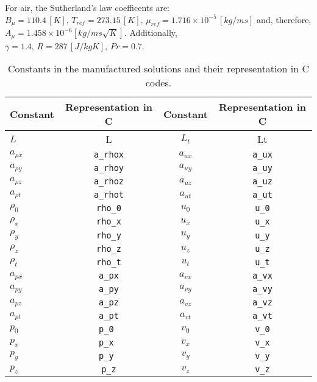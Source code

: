 For air, the Sutherland's law coefficents are: $B_\mu   = 110.4 \, [K], \, T_{ref} = 273.15 \, [K],  \, \mu_{ref} = 1.716\times 10^{-5}\, [kg/ms]$ and, therefore, $A_\mu=1.458\times 10^{-6} [kg /ms\sqrt{K}]$. Additionally, $\gamma  = 1.4 ,\, R = 287 \, [J/kg K],\, Pr  = 0.7$. 

\begin{table}[htb]
\caption{Constants in the manufactured solutions and their representation in C codes.}
\centering
\begin{tabular}{l c | c c}
\hline\hline
     Constant     &Representation in C  & Constant     & Representation in C \\ [0.25ex]
\hline 
$L$			  & L	   				&  $ L_{t}$ 	& Lt	   \\
$ a_{\rho x}$ & \texttt{a\_rhox}	&  $a_{ux}$ 	&\texttt{a\_ux}    \\ 
$ a_{\rho y}$ & \texttt{a\_rhoy}	&  $ a_{uy}$ 	& \texttt{a\_uy}   \\ 
$ a_{\rho z}$ & \texttt{a\_rhoz}	&  $ a_{uz}$ 	& \texttt{a\_uz}   \\ 
$ a_{\rho t}$ & \texttt{a\_rhot}	&  $ a_{ut}$ 	& \texttt{a\_ut}   \\ 
$ \rho_{0}$  & 	\texttt{rho\_0}   	&  $ u_{0}$ 		& \texttt{u\_0}   \\ 
$ \rho_{x}$ & 	\texttt{rho\_x}   	&  $ u_{x}$ 	& \texttt{u\_x}   \\
$ \rho_{y}$ & 	\texttt{rho\_y}   	&  $ u_{y}$ 	& \texttt{u\_y}   \\ 
$ \rho_{z}$ & 	\texttt{rho\_z}   	&  $ u_{z}$ 	& \texttt{u\_z}   \\ 
$ \rho_{t}$ & 	\texttt{rho\_t}   	&  $ u_{t}$ 	& \texttt{u\_t}   \\ 
$ a_{px}$ & 	\texttt{a\_px}   	&  $ a_{vx}$ 	& \texttt{a\_vx}   \\ 
$ a_{py}$ & 	\texttt{a\_py}   	&  $ a_{vy}$ 	& \texttt{a\_vy}   \\ 
$ a_{pz}$ & 	\texttt{a\_pz}   	&  $ a_{vz}$ 	& \texttt{a\_vz}   \\ 
$ a_{pt}$ & 	\texttt{a\_pt}   	&  $ a_{vt}$ 	& \texttt{a\_vt}   \\ 
$ p_{0}$ & 		\texttt{p\_0 }  	&  $ v_{0}$ 		& \texttt{v\_0}   \\ 
$ p_{x}$ & 		\texttt{p\_x }  	&  $ v_{x}$ 	& \texttt{v\_x}   \\ 
$ p_{y}$ &		\texttt{p\_y }  	&  $ v_{y}$		& \texttt{v\_y}   \\ 
$ p_{z}$ & 		\texttt{p\_z}   	&  $ v_{z}$		& \texttt{v\_z}   \\

\end{tabular}
\end{table}
